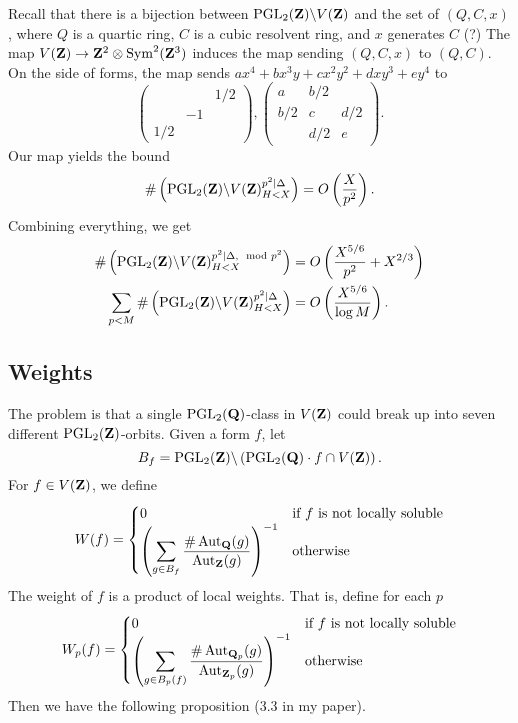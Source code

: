 Recall that there is a bijection between 
$\operatorname{PGL}_2(\mathbf{Z})\backslash V(\mathbf{Z})$ and the set of $(Q,C,x)$, 
where $Q$ is a quartic ring, $C$ is a cubic resolvent ring, and $x$ generates 
$C$ (?) The map $V(\mathbf{Z}) \to \mathbf{Z}^2\otimes \operatorname{Sym}^2(\mathbf{Z}^3)$ induces 
the map sending $(Q,C,x)$ to $(Q,C)$. On the side of forms, the map sends 
$a x^4 + b x^3 y + c x^2 y^2 + d x y^3 + e y^4$ to 
\[
  \begin{pmatrix} & & 1/2 \\ & -1 \\ 1/2 \end{pmatrix}, \begin{pmatrix} a & b/2 \\ b/2 & c & d/2 \\ & d/2 & e \end{pmatrix} .
\]
Our map yields the bound 
\[
  \#\left(\operatorname{PGL}_2(\mathbf{Z})\backslash V(\mathbf{Z})_{H<X}^{p^2\mid \Delta}\right) = O\left(\frac{X}{p^2}\right) .
\]
Combining everything, we get 
\begin{align*}
  \#\left(\operatorname{PGL}_2(\mathbf{Z})\backslash V(\mathbf{Z})_{H<X}^{p^2\mid \Delta,\mod p^2}\right) 
    &= O\left(\frac{X^{5/6}}{p^2} + X^{2/3}\right) \\
  \sum_{p<M} \#\left(\operatorname{PGL}_2(\mathbf{Z})\backslash V(\mathbf{Z})_{H<X}^{p^2\mid\Delta}\right) 
    &= O\left(\frac{X^{5/6}}{\log M}\right) .
\end{align*}





\subsection{Weights}

The problem is that a single $\operatorname{PGL}_2(\mathbf{Q})$-class in 
$V(\mathbf{Z})$ could break up into seven different 
$\operatorname{PGL}_2(\mathbf{Z})$-orbits. Given a form $f$, let 
\[
  B_f = \operatorname{PGL}_2(\mathbf{Z})\backslash \left(\operatorname{PGL}_2(\mathbf{Q})\cdot f\cap V(\mathbf{Z})\right) .
\]
For $f\in V(\mathbf{Z})$, we define 
\[
  W(f) = \begin{cases} 0 & \text{if $f$ is not locally soluble} \\ \left(\displaystyle\sum_{g\in B_f} \frac{\#\operatorname{Aut}_{\mathbf{Q}}(g)}{\operatorname{Aut}_{\mathbf{Z}} (g)}\right)^{-1} & \text{otherwise} \end{cases} 
\]
The weight of $f$ is a product of local weights. That is, define for each $p$ 
\[
  W_p(f) = \begin{cases} 0 & \text{if $f$ is not locally soluble} \\ \left(\displaystyle\sum_{g\in B_p(f)} \frac{\#\operatorname{Aut}_{\mathbf{Q}_p}(g)}{\operatorname{Aut}_{\mathbf{Z}_p} (g)}\right)^{-1} & \text{otherwise} \end{cases} 
\]
Then we have the following proposition (3.3 in my paper). 

